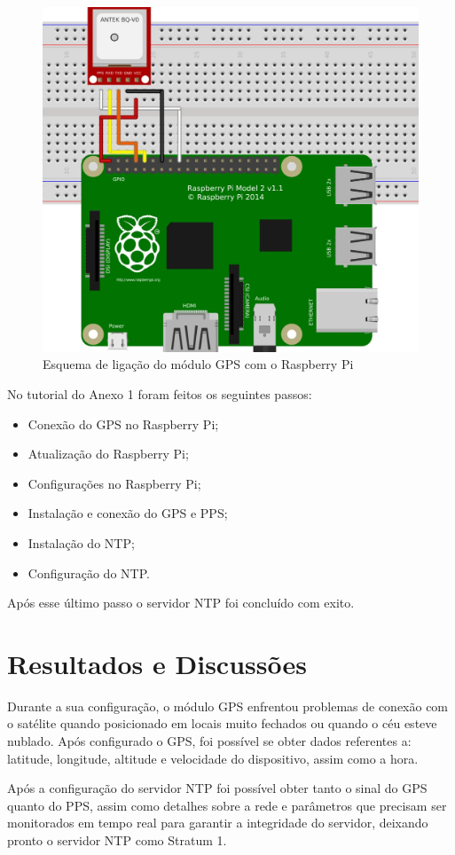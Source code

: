 \documentclass[12pt]{article}
\begin{document}
\begin{figure}[ht]
\centering
\includegraphics[width=.7\textwidth]{fig1.jpg}
\caption{ Esquema de ligação do módulo GPS com o Raspberry Pi}
\label{fig:exampleFig1}
\end{figure}
No tutorial do Anexo 1 foram feitos os seguintes passos: 
\begin{itemize}
\item Conexão do GPS no Raspberry Pi;
\item Atualização do Raspberry Pi;
\item Configurações no Raspberry Pi;
\item Instalação e conexão do GPS e PPS;
\item Instalação do NTP;
\item Configuração do NTP.
\end{itemize}
Após esse último passo o servidor NTP foi concluído com exito.
\section{Resultados e Discussões}

Durante a sua configuração, o módulo GPS enfrentou problemas de conexão com o satélite quando posicionado em locais muito fechados ou quando o céu esteve nublado. Após configurado o GPS, foi possível se obter dados referentes a: latitude, longitude, altitude e velocidade do dispositivo, assim como a hora.

Após a configuração do servidor NTP foi possível obter tanto o sinal do GPS quanto do PPS, assim como detalhes sobre a rede e parâmetros que precisam ser monitorados em tempo real para garantir a integridade do servidor, deixando pronto o servidor NTP como Stratum 1.
\end{document}

